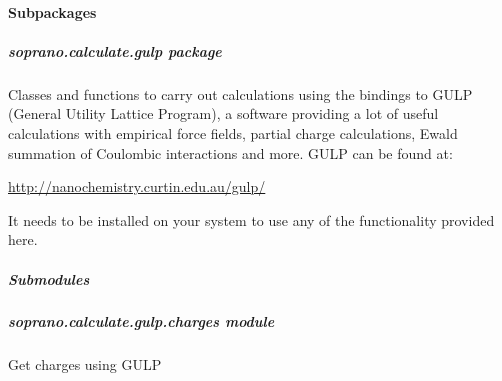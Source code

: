 \documentclass[letterpaper,10pt,english]{sphinxmanual}
\begin{document}
\paragraph{Subpackages}
\label{doctree/soprano.calculate:subpackages}

\subparagraph{soprano.calculate.gulp package}
\label{doctree/soprano.calculate.gulp:module-soprano.calculate.gulp}\label{doctree/soprano.calculate.gulp::doc}\label{doctree/soprano.calculate.gulp:soprano-calculate-gulp-package}
Classes and functions to carry out calculations using the bindings to GULP
(General Utility Lattice Program), a software providing a lot of useful
calculations with empirical force fields, partial charge calculations, Ewald
summation of Coulombic interactions and more. GULP can be found at:

\url{http://nanochemistry.curtin.edu.au/gulp/}

It needs to be installed on your system to use any of the functionality
provided here.


\subparagraph{Submodules}
\label{doctree/soprano.calculate.gulp:submodules}

\subparagraph{soprano.calculate.gulp.charges module}
\label{doctree/soprano.calculate.gulp.charges:soprano-calculate-gulp-charges-module}\label{doctree/soprano.calculate.gulp.charges:module-soprano.calculate.gulp.charges}\label{doctree/soprano.calculate.gulp.charges::doc}
Get charges using GULP
\end{document}
